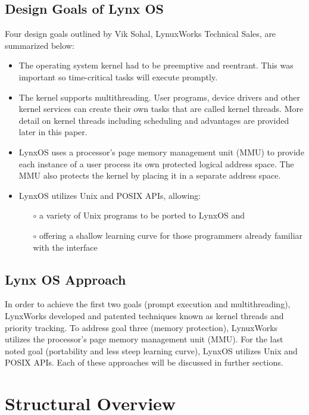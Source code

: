 \documentclass[12pt]{article}
\begin{document}
\subsection{Design Goals of Lynx OS}
Four design goals outlined by Vik Sohal, LynuxWorks Technical Sales, are summarized
below:

\begin{itemize}

	\item The operating system kernel had to be preemptive and reentrant. This was
important so time-critical tasks will execute promptly.	
	\item The kernel supports multithreading. User programs, device drivers and other
kernel services can create their own tasks that are called kernel threads. More
detail on kernel threads including scheduling and advantages are provided later in
this paper. 
	\item LynxOS uses a processor's page memory management unit (MMU) to provide
each instance of a user process its own protected logical address space. The MMU
also protects the kernel by placing it in a separate address space.
	\item LynxOS utilizes Unix and POSIX APIs, allowing:
		\begin{itemize}
			\item[$\circ$] a variety of Unix programs to be ported to LynxOS and 
			\item[$\circ$] offering a shallow learning curve for those programmers already familiar
with the interface 
		\end{itemize}
	
\end{itemize}

\subsection{Lynx OS Approach}

In order to achieve the first two goals (prompt execution and multithreading),
LynxWorks developed and patented techniques known as kernel threads and priority
tracking. To address goal three (memory protection), LynuxWorks utilizes the
processor's page memory management unit (MMU). For the last noted goal (portability
and less steep learning curve), LynxOS utilizes Unix and POSIX APIs. Each of these
approaches will be discussed in further sections. 

\cleardoublepage


\section{Structural Overview}\label{sec:architecture}
\end{document}
